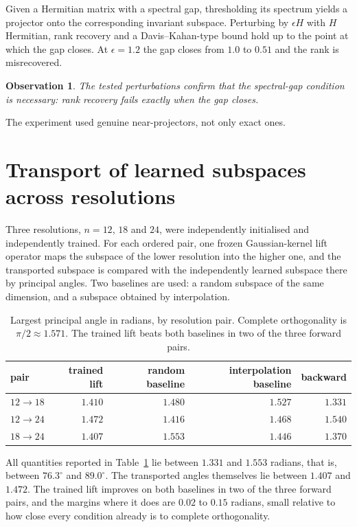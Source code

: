 \documentclass[11pt]{amsart}
\newtheorem{observation}{Observation}[section]
\theoremstyle{remark}
\begin{document}
Given a Hermitian matrix with a spectral gap, thresholding its spectrum yields a projector
onto the corresponding invariant subspace. Perturbing by $\epsilon H$ with $H$ Hermitian,
rank recovery and a Davis--Kahan-type bound \cite{DavisKahan1970} hold up to the point at
which the gap closes. At $\epsilon=1.2$ the gap closes from $1.0$ to $0.51$ and the rank is
misrecovered.

\begin{observation}
\label{obs:snapping}
The tested perturbations confirm that the spectral-gap condition is necessary: rank
recovery fails exactly when the gap closes.
\end{observation}

The experiment used genuine near-projectors, not only exact ones.

\section{Transport of learned subspaces across resolutions}
\label{sec:transport}

Three resolutions, $n=12$, $18$ and $24$, were independently initialised and independently
trained. For each ordered pair, one frozen Gaussian-kernel lift operator maps the subspace
of the lower resolution into the higher one, and the transported subspace is compared with
the independently learned subspace there by principal angles. Two baselines are used: a
random subspace of the same dimension, and a subspace obtained by interpolation.

\begin{table}[h]
\centering\small
\caption{Largest principal angle in radians, by resolution pair. Complete orthogonality is
$\pi/2\approx1.571$. The trained lift beats both baselines in two of the three forward
pairs.}
\label{tab:transport}
\begin{tabular}{@{}lrrrr@{}}
\toprule
pair & trained lift & random baseline & interpolation baseline & backward \\
\midrule
$12\to18$ & $1.410$ & $1.480$ & $1.527$ & $1.331$ \\
$12\to24$ & $1.472$ & $1.416$ & $1.468$ & $1.540$ \\
$18\to24$ & $1.407$ & $1.553$ & $1.446$ & $1.370$ \\
\bottomrule
\end{tabular}
\end{table}

All quantities reported in Table~\ref{tab:transport} lie between $1.331$ and $1.553$
radians, that is, between $76.3^{\circ}$ and $89.0^{\circ}$. The transported angles
themselves lie between $1.407$ and $1.472$. The trained lift improves on both baselines in
two of the three forward pairs, and the margins where it does are $0.02$ to $0.15$ radians,
small relative to how close every condition already is to complete orthogonality.
\end{document}
